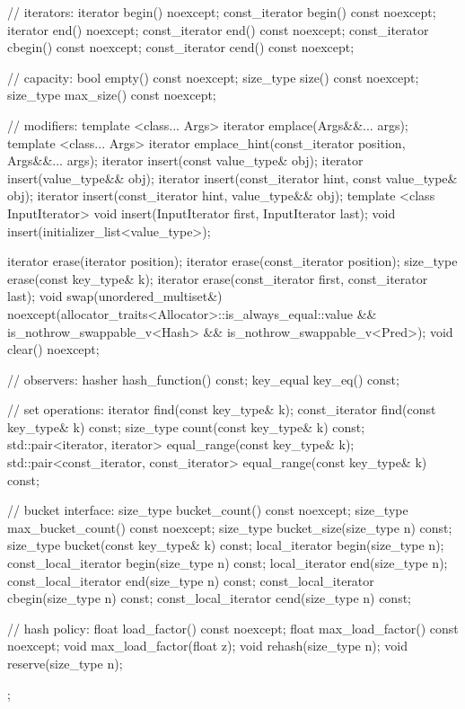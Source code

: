 \begin{codeblock}
{{    // iterators:
    iterator       begin() noexcept;
    const_iterator begin() const noexcept;
    iterator       end() noexcept;
    const_iterator end() const noexcept;
    const_iterator cbegin() const noexcept;
    const_iterator cend() const noexcept;

    // capacity:
    bool      empty() const noexcept;
    size_type size() const noexcept;
    size_type max_size() const noexcept;

    // modifiers:
    template <class... Args> iterator emplace(Args&&... args);
    template <class... Args> iterator emplace_hint(const_iterator position, Args&&... args);
    iterator insert(const value_type& obj);
    iterator insert(value_type&& obj);
    iterator insert(const_iterator hint, const value_type& obj);
    iterator insert(const_iterator hint, value_type&& obj);
    template <class InputIterator> void insert(InputIterator first, InputIterator last);
    void insert(initializer_list<value_type>);

    iterator  erase(iterator position);
    iterator  erase(const_iterator position);
    size_type erase(const key_type& k);
    iterator  erase(const_iterator first, const_iterator last);
    void      swap(unordered_multiset&)
      noexcept(allocator_traits<Allocator>::is_always_equal::value &&
               is_nothrow_swappable_v<Hash> &&
               is_nothrow_swappable_v<Pred>);
    void      clear() noexcept;

    // observers:
    hasher hash_function() const;
    key_equal key_eq() const;

    // set operations:
    iterator       find(const key_type& k);
    const_iterator find(const key_type& k) const;
    size_type      count(const key_type& k) const;
    std::pair<iterator, iterator>             equal_range(const key_type& k);
    std::pair<const_iterator, const_iterator> equal_range(const key_type& k) const;

    // bucket interface:
    size_type bucket_count() const noexcept;
    size_type max_bucket_count() const noexcept;
    size_type bucket_size(size_type n) const;
    size_type bucket(const key_type& k) const;
    local_iterator begin(size_type n);
    const_local_iterator begin(size_type n) const;
    local_iterator end(size_type n);
    const_local_iterator end(size_type n) const;
    const_local_iterator cbegin(size_type n) const;
    const_local_iterator cend(size_type n) const;

    // hash policy:
    float load_factor() const noexcept;
    float max_load_factor() const noexcept;
    void max_load_factor(float z);
    void rehash(size_type n);
    void reserve(size_type n);
  };

}
\end{codeblock}
